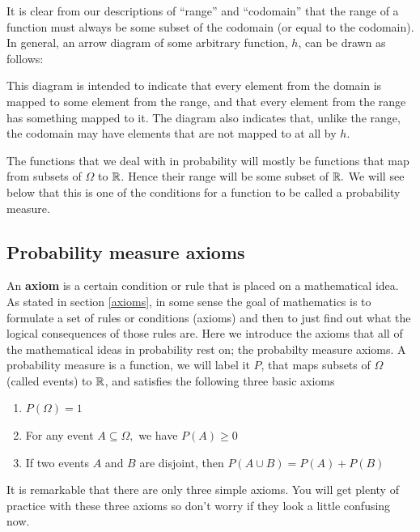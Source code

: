 \noindent It is clear from our descriptions of ``range'' and ``codomain'' that the range of a function must always be some subset of the codomain (or equal to the codomain). In general, an arrow diagram of some arbitrary function, $h$, can be drawn as follows:
\begin{center}
\end{center}
\noindent This diagram is intended to indicate that every element from the domain is mapped to some element from the range, and that every element from the range has something mapped to it. The diagram also indicates that, unlike the range, the codomain may have elements that are not mapped to at all by $h$.

\noindent The functions that we deal with in probability will mostly be functions that map from subsets of $\Omega$ to $\mathbb{R}$. Hence their range will be some subset of $\mathbb{R}.$ We will see below that this is one of the conditions for a function to be called a probability measure.  \label{range} \label{codomain}

\subsection{Probability measure axioms} \label{paxioms}
An \textbf{axiom} is a certain condition or rule that is placed on a mathematical idea. As stated in section \ref{axioms}, in some sense the goal of mathematics is to formulate a set of rules or conditions (axioms) and then to just find out what the logical consequences of those rules are. Here we introduce the axioms that all of the mathematical ideas in probability rest on; the probabilty measure axioms. A probability measure \label{probability measure} is a function, we will label it $P$, that maps subsets of $\Omega$ (called events) to $\mathbb{R}$, and satisfies the following three basic axioms \label{symbP()} \label{axiom}
\begin{enumerate}
\item $P(\Omega) = 1$
\item For any event $A \subseteq \Omega,$ we have $P(A) \geq 0$
\item If two events $A$ and $B$ are disjoint, then $P(A \cup B) = P(A) + P(B)$
\end{enumerate}
It is remarkable that there are only three simple axioms. You will get plenty of practice with these three axioms so don't worry if they look a little confusing now. \\

